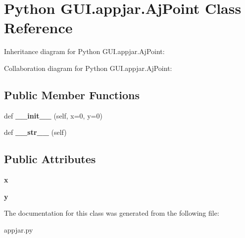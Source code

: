 \hypertarget{class_python_01_g_u_i_1_1appjar_1_1_aj_point}{}\section{Python G\+U\+I.\+appjar.\+Aj\+Point Class Reference}
\label{class_python_01_g_u_i_1_1appjar_1_1_aj_point}


Inheritance diagram for Python G\+U\+I.\+appjar.\+Aj\+Point\+:


Collaboration diagram for Python G\+U\+I.\+appjar.\+Aj\+Point\+:
\subsection*{Public Member Functions}
\begin{DoxyCompactItemize}
\item 
\mbox{\label{class_python_01_g_u_i_1_1appjar_1_1_aj_point_adc48546447b83d015fbc102846274f19}} 
def {\bfseries \+\_\+\+\_\+init\+\_\+\+\_\+} (self, x=0, y=0)
\item 
\mbox{\label{class_python_01_g_u_i_1_1appjar_1_1_aj_point_a3c3cfd72957afc6d4f0e524cec40fe57}} 
def {\bfseries \+\_\+\+\_\+str\+\_\+\+\_\+} (self)
\end{DoxyCompactItemize}
\subsection*{Public Attributes}
\begin{DoxyCompactItemize}
\item 
\mbox{\label{class_python_01_g_u_i_1_1appjar_1_1_aj_point_a0b12328a66869f1dc13d5209a9ec4cc1}} 
{\bfseries x}
\item 
\mbox{\label{class_python_01_g_u_i_1_1appjar_1_1_aj_point_a1307c62a97992d8c0c89d0a1eb5a7d18}} 
{\bfseries y}
\end{DoxyCompactItemize}


The documentation for this class was generated from the following file\+:\begin{DoxyCompactItemize}
\item 
appjar.\+py\end{DoxyCompactItemize}
